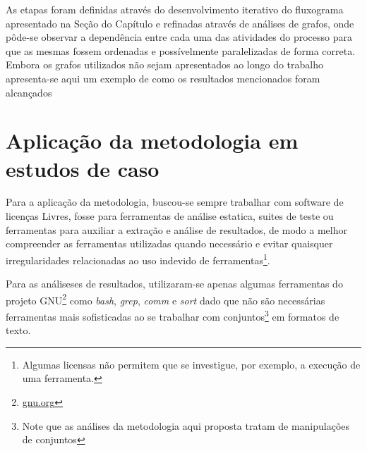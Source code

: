 As etapas foram definidas através do desenvolvimento iterativo do fluxograma apresentado na Seção  do Capítulo  e refinadas através de análises de grafos, onde pôde-se observar a dependência entre cada uma das atividades do processo para que as mesmas fossem ordenadas e possívelmente paralelizadas de forma correta. Embora os grafos utilizados não sejam apresentados ao longo do trabalho apresenta-se aqui um exemplo de como os resultados mencionados foram alcançados %

\section{Aplicação da metodologia em estudos de caso}

Para a aplicação da metodologia, buscou-se sempre trabalhar com software de licenças Livres, fosse para ferramentas de análise estatica, suites de teste ou ferramentas para auxiliar a extração e análise de resultados, de modo a melhor compreender as ferramentas utilizadas quando necessário e evitar quaisquer irregularidades relacionadas ao uso indevido de ferramentas\footnote{Algumas licensas não permitem que se investigue, por exemplo, a execução de uma ferramenta.}.

Para as análiseses de resultados, utilizaram-se apenas algumas ferramentas do projeto GNU\footnote{\url{gnu.org}} como \textit{bash}, \textit{grep}, \textit{comm} e \textit{sort} dado que não são necessárias ferramentas mais sofisticadas ao se trabalhar com conjuntos\footnote{Note que as análises da metodologia aqui proposta tratam de manipulações de conjuntos} em formatos de texto.

